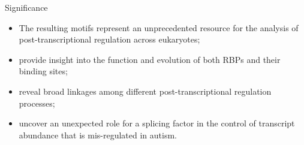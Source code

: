\documentclass[professionalfont, 12pt, default]{beamer}
\providecommand{\tightlist}{%
    \setlength{\itemsep}{0pt}\setlength{\parskip}{0pt}}
\begin{document}
\begin{frame}{Significance}

\begin{itemize}
\tightlist
\item
  The resulting motifs represent an unprecedented resource for the
  analysis of post-transcriptional regulation across eukaryotes;
\item
  provide insight into the function and evolution of both RBPs and their
  binding sites;
\item
  reveal broad linkages among different post-transcriptional regulation
  processes;
\item
  uncover an unexpected role for a splicing factor in the control of
  transcript abundance that is mis-regulated in autism.
\end{itemize}

\end{frame}
\end{document}

